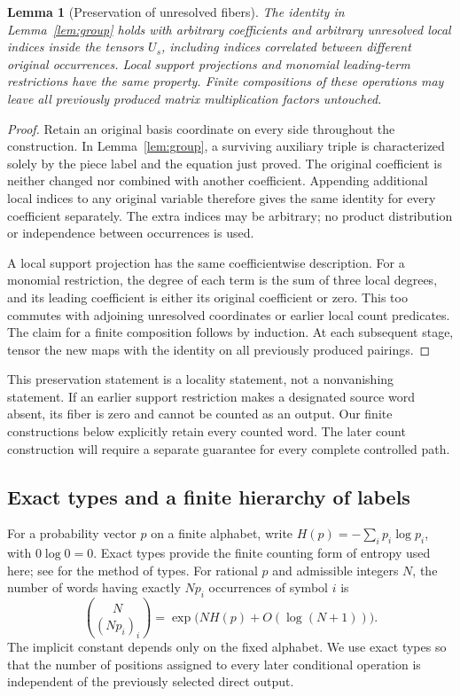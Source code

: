 \documentclass[11pt]{article}
\numberwithin{equation}{section}
\newtheorem{lemma}[theorem]{Lemma}
\theoremstyle{definition}
\theoremstyle{remark}
\begin{document}
\begin{lemma}[Preservation of unresolved fibers]
\label{alg:payload}
The identity in Lemma~\ref{lem:group} holds with arbitrary coefficients
and arbitrary unresolved local indices inside the tensors \(U_s\),
including indices correlated between different original occurrences.
Local support projections and monomial leading-term restrictions have the
same property.  Finite compositions of these operations may leave all
previously produced matrix multiplication factors untouched.
\end{lemma}
\begin{proof}
Retain an original basis coordinate on every side throughout the
construction.  In Lemma~\ref{lem:group}, a surviving auxiliary triple is
characterized solely by the piece label and the equation just proved.
The original coefficient is neither changed nor combined with another
coefficient.  Appending additional local indices to any original variable
therefore gives the same identity for every coefficient separately.  The
extra indices may be arbitrary; no product distribution or independence
between occurrences is used.

A local support projection has the same coefficientwise description.
For a monomial restriction, the degree of each term is the sum of three
local degrees, and its leading coefficient is either its original
coefficient or zero.  This too commutes with adjoining unresolved
coordinates or earlier local count predicates.  The claim for a finite
composition follows by induction.  At each subsequent stage, tensor the
new maps with the identity on all previously produced pairings.
\end{proof}

This preservation statement is a locality statement, not a nonvanishing
statement.  If an earlier support restriction makes a designated source
word absent, its fiber is zero and cannot be counted as an output.  Our
finite constructions below explicitly retain every counted word.  The
later count construction will require a separate guarantee for every
complete controlled path.

\subsection{Exact types and a finite hierarchy of labels}
\label{alg:hierarchy-section}

For a probability vector \(p\) on a finite alphabet, write
\(H(p)=-\sum_i p_i\log p_i\), with \(0\log0=0\).
Exact types provide the finite counting form of entropy used here;
see \citet{csiszar1998} for the method of types.
For rational \(p\) and admissible integers \(N\), the number of words
having exactly \(Np_i\) occurrences of symbol \(i\) is
\begin{equation}
 \binom{N}{(Np_i)_i}
 =\exp\bigl(NH(p)+O(\log(N+1))\bigr).
 \label{alg:type-count}
\end{equation}
The implicit constant depends only on the fixed alphabet.  We use exact
types so that the number of positions assigned to every later conditional
operation is independent of the previously selected direct output.
\end{document}
